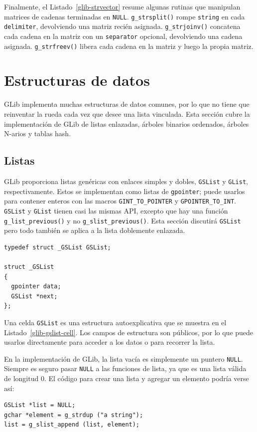 Finalmente, el Listado~\ref{glib-strvector} resume algunas rutinas que manipulan matrices de cadenas terminadas en \lstinline{NULL}. \lstinline{g_strsplit()} rompe \lstinline{string} en cada \lstinline{delimiter}, devolviendo una matriz recién asignada. \lstinline{g_strjoinv()} concatena cada cadena en la matriz con un \lstinline{separator} opcional, devolviendo una cadena asignada. \lstinline{g_strfreev()} libera cada cadena en la matriz y luego la propia matriz.

\section{Estructuras de datos}

GLib implementa muchas estructuras de datos comunes, por lo que no tiene que reinventar la rueda cada vez que desee una lista vinculada. Esta sección cubre la implementación de GLib de listas enlazadas, árboles binarios ordenados, árboles N-arios y tablas hash.

\subsection{Listas}

GLib proporciona listas genéricas con enlaces simples y dobles, \lstinline{GSList} y \lstinline{GList}, respectivamente. Estos se implementan como listas de \lstinline{gpointer}; puede usarlos para contener enteros con las macros \lstinline{GINT_TO_POINTER} y \lstinline{GPOINTER_TO_INT}. \lstinline{GSList} y \lstinline{GList} tienen casi las mismas API, excepto que hay una función \lstinline{g_list_previous()} y no \lstinline{g_slist_previous()}. Esta sección discutirá \lstinline{GSList} pero todo también se aplica a la lista doblemente enlazada.

\begin{lstlisting}[float, caption={\lstinline{GSList} cell}, label=glib-gslist-cell]
typedef struct _GSList GSList;

struct _GSList
{
  gpointer data;
  GSList *next;
};
\end{lstlisting}

Una celda \lstinline{GSList} es una estructura autoexplicativa que se muestra en el Listado~\ref{glib-gslist-cell}. Los campos de estructura son públicos, por lo que puede usarlos directamente para acceder a los datos o para recorrer la lista.

En la implementación de GLib, la lista vacía es simplemente un puntero \lstinline{NULL}. Siempre es seguro pasar \lstinline{NULL} a las funciones de lista, ya que es una lista válida de longitud 0. El código para crear una lista y agregar un elemento podría verse así:
\begin{lstlisting}
GSList *list = NULL;
gchar *element = g_strdup ("a string");
list = g_slist_append (list, element);
\end{lstlisting}

